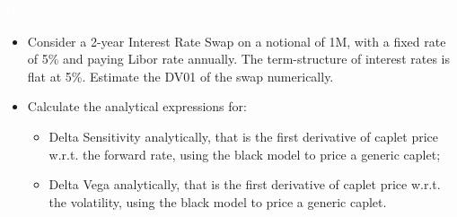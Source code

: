 \documentclass{beamer}
\begin{document}
	\begin{homework}
		\begin{frame}{\textcolor{white}{Homework}}
			\begin{itemize}
				\item[white] Consider a 2-year Interest Rate Swap on a notional of 1M, with a fixed rate of 5\% and paying Libor rate annually. The term-structure of interest rates is flat at 5\%.
				Estimate the DV01 of the swap numerically.
				\item[white] Calculate the analytical expressions for:
				\begin{itemize}
					\item[white] Delta Sensitivity analytically, that is the first derivative of caplet price w.r.t. the forward rate, using the black model to price a generic caplet;
					\item[white] Delta Vega analytically, that is the first derivative of caplet price w.r.t. the volatility, using the black model to price a generic caplet.
				\end{itemize}
			\end{itemize}
		\end{frame}
	\end{homework}

\end{document}
